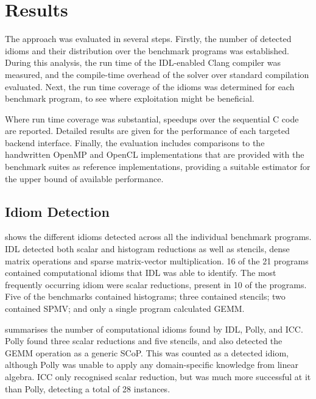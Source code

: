 \section{Results}
\label{sec:idiomresults}

    The approach was evaluated in several steps.
    Firstly, the number of detected idioms and their distribution over the
    benchmark programs was established.
    During this analysis, the run time of the IDL-enabled Clang compiler was
    measured, and the compile-time overhead of the solver over standard
    compilation evaluated.
    Next, the run time coverage of the idioms was determined for each
    benchmark program, to see where exploitation might be beneficial.

    Where run time coverage was substantial, speedups over the sequential C code
    are reported.
    Detailed results are given for the performance of each targeted backend
    interface.
    Finally, the evaluation includes comparisons to the handwritten OpenMP and
    OpenCL implementations that are provided with the benchmark suites as
    reference implementations, providing a suitable estimator for the upper
    bound of available performance.

\subsection{Idiom Detection}

     shows the different idioms detected across
    all the individual benchmark programs.
    IDL detected both scalar and histogram reductions as well as stencils, dense
    matrix operations and sparse matrix-vector multiplication.
    16 of the 21 programs contained computational idioms that IDL was able to
    identify.
    The most frequently occurring idiom were scalar reductions, present in 10
    of the programs.
    Five of the benchmarks contained histograms; three contained stencils;
    two contained SPMV; and only a single program calculated GEMM.

     summarises the number of computational idioms found by
    IDL, Polly, and ICC.
    Polly found three scalar reductions and five stencils, and also detected the
    GEMM operation as a generic SCoP.
    This was counted as a detected idiom, although Polly was unable to apply any
    domain-specific knowledge from linear algebra.
    ICC only recognised scalar reduction, but was much more successful at it
    than Polly, detecting a total of 28 instances.

